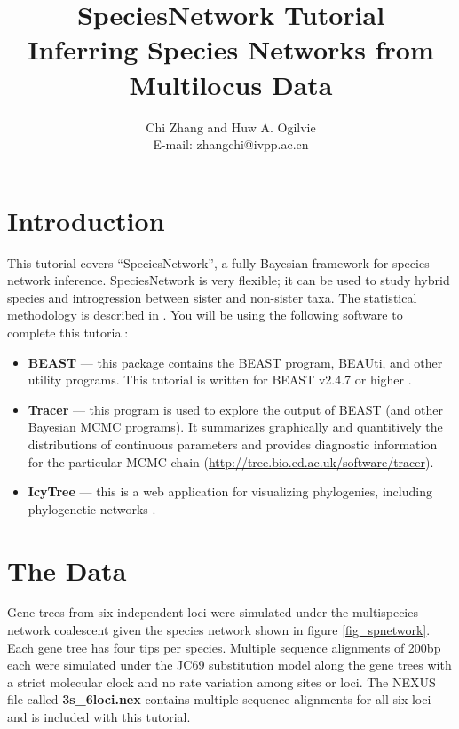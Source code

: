 \documentclass[11pt]{article}
\begin{document}
\title{SpeciesNetwork Tutorial \\
\large Inferring Species Networks from Multilocus Data}
\author{Chi Zhang and Huw A. Ogilvie\\
E-mail: zhangchi@ivpp.ac.cn}
\maketitle

\section*{Introduction}

This tutorial covers ``SpeciesNetwork'', a fully Bayesian framework for
species network inference. SpeciesNetwork is very flexible; it can be used to
study hybrid species and introgression between sister and non-sister taxa. The
statistical methodology is described in \citet{Zhang:2017gq}. You will be
using the following software to complete this tutorial:

\begin{itemize}
\item \textbf{BEAST} --- this package contains the BEAST program, BEAUti, and other utility programs. This tutorial is written for BEAST v2.4.7 or higher \citep[\url{http://beast2.org},][]{Bouckaert:2014iz}.
\item \textbf{Tracer} --- this program is used to explore the output of BEAST (and other Bayesian MCMC programs). It summarizes graphically and quantitively the distributions of continuous parameters and provides diagnostic information for the particular MCMC chain (\url{http://tree.bio.ed.ac.uk/software/tracer}).
\item \textbf{IcyTree} --- this is a web application for visualizing phylogenies, including phylogenetic networks \citep[\url{icytree.org};][]{Vaughan:2017fu}.
\end{itemize}

\section*{The Data}

Gene trees from six independent loci were simulated under the multispecies network coalescent \citep[MSNC;][]{Yu:2014dt} given the species network shown in figure \ref{fig_spnetwork}. Each gene tree has four tips per species. Multiple sequence alignments of 200bp each were simulated under the JC69 substitution model \citep{Jukes:1969wx} along the gene trees with a strict molecular clock and no rate variation among sites or loci. The NEXUS file called \textbf{3s\_6loci.nex} contains multiple sequence alignments for all six loci and is included with this tutorial.
\end{document}
